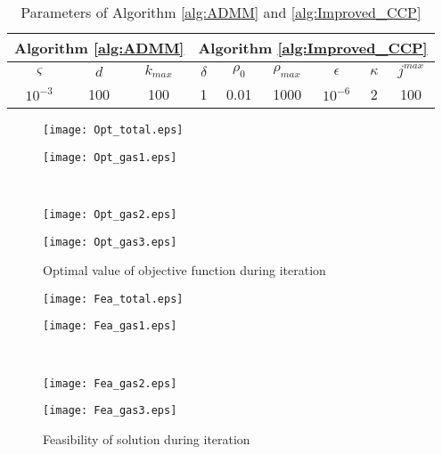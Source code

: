 \documentclass[journal]{IEEEtran}
\begin{document}
\begin{table}[ht]
\footnotesize
  \centering
  \caption{Parameters of Algorithm \ref{alg:ADMM} and \ref{alg:Improved_CCP}}\label{Tab:parameter}
  \begin{tabular}{c|c|c|c|c|c|c|c|c}
  \hline
  \multicolumn{3}{c|}{Algorithm \ref{alg:ADMM}}& \multicolumn{6}{c}{Algorithm \ref{alg:Improved_CCP}}\\
  \hline
   $\varsigma$&$d$ &$k_{max}$& $\delta$ & $\rho_0$ & $\rho_{max}$ & $\epsilon$ & $\kappa$ & $j^{max}$ \\
  \hline
   $10^{-3}$&100&100& 1 & 0.01 & 1000 & $10^{-6}$ & 2 & 100\\
  \hline
  \end{tabular}
\end{table}
\begin{figure}
\begin{minipage}[t]{0.5\linewidth}
  \centering
  \texttt{[image: Opt\_total.eps]}
  \end{minipage}  \begin{minipage}[t]{0.5\linewidth}
    \centering
  \texttt{[image: Opt\_gas1.eps]}
  \end{minipage}\\
  \begin{minipage}[t]{0.5\linewidth}
    \texttt{[image: Opt\_gas2.eps]}
  \end{minipage}  \begin{minipage}[t]{0.5\linewidth}
    \centering
  \texttt{[image: Opt\_gas3.eps]}
  \end{minipage}  \caption{Optimal value of objective function during iteration}\label{fig:Optimality}
\end{figure}

\begin{figure}
\begin{minipage}[t]{0.5\linewidth}
  \centering
  \texttt{[image: Fea\_total.eps]}
  \end{minipage}  \begin{minipage}[t]{0.5\linewidth}
    \centering
  \texttt{[image: Fea\_gas1.eps]}
  \end{minipage}\\
  \begin{minipage}[t]{0.5\linewidth}
    \texttt{[image: Fea\_gas2.eps]}
  \end{minipage}  \begin{minipage}[t]{0.5\linewidth}
    \centering
  \texttt{[image: Fea\_gas3.eps]}
  \end{minipage}  \caption{Feasibility of solution during iteration}\label{fig:Feasibility}
\end{figure}
\end{document}
